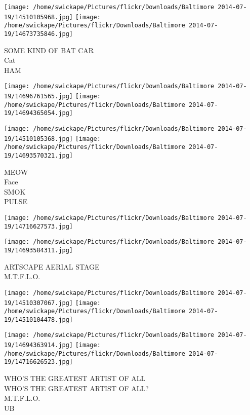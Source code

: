 \documentclass[10pt,letterpaper]{article}
\begin{document}
\vspace{0.25in}
\texttt{[image: /home/swickape/Pictures/flickr/Downloads/Baltimore 2014-07-19/14510105968.jpg]}
\texttt{[image: /home/swickape/Pictures/flickr/Downloads/Baltimore 2014-07-19/14673735846.jpg]}

SOME KIND OF BAT CAR\\
Cat\\
HAM\\
\pagebreak

\texttt{[image: /home/swickape/Pictures/flickr/Downloads/Baltimore 2014-07-19/14696761565.jpg]}
\texttt{[image: /home/swickape/Pictures/flickr/Downloads/Baltimore 2014-07-19/14694365054.jpg]}

\texttt{[image: /home/swickape/Pictures/flickr/Downloads/Baltimore 2014-07-19/14510105368.jpg]}
\texttt{[image: /home/swickape/Pictures/flickr/Downloads/Baltimore 2014-07-19/14693570321.jpg]}

MEOW\\
Face\\
SMOK\\
PULSE\\
\pagebreak

\texttt{[image: /home/swickape/Pictures/flickr/Downloads/Baltimore 2014-07-19/14716627573.jpg]}

\vspace{0.25in}
\texttt{[image: /home/swickape/Pictures/flickr/Downloads/Baltimore 2014-07-19/14693584311.jpg]}

ARTSCAPE AERIAL STAGE\\
M.T.F.L.O.\\
\pagebreak

\texttt{[image: /home/swickape/Pictures/flickr/Downloads/Baltimore 2014-07-19/14510307067.jpg]}
\texttt{[image: /home/swickape/Pictures/flickr/Downloads/Baltimore 2014-07-19/14510104478.jpg]}

\texttt{[image: /home/swickape/Pictures/flickr/Downloads/Baltimore 2014-07-19/14694363914.jpg]}
\texttt{[image: /home/swickape/Pictures/flickr/Downloads/Baltimore 2014-07-19/14716626523.jpg]}

WHO'S THE GREATEST ARTIST OF ALL\\
WHO'S THE GREATEST ARTIST OF ALL?\\
M.T.F.L.O.\\
UB\\
\pagebreak
\end{document}
